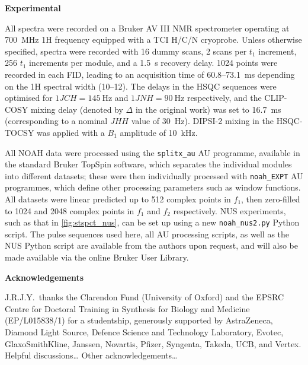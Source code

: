 \documentclass[11pt]{article}
\newcommand*{\proton}{1H}
\newcommand*{\onejch}{1JCH}
\newcommand*{\onejnh}{1JNH}
\newcommand*{\jhh}{JHH}
\begin{document}
\begin{refsection}
\textbf{\Large Experimental}

All spectra were recorded on a Bruker AV III NMR spectrometer operating at \SI{700}{\MHz} \proton{} frequency equipped with a TCI H/C/N cryoprobe.
Unless otherwise specified, spectra were recorded with 16 dummy scans, 2 scans per $t_1$ increment, 256 $t_1$ increments per module, and a \SI{1.5}{\s} recovery delay.
1024 points were recorded in each FID, leading to an acquisition time of 60.8--\SI{73.1}{\ms} depending on the \proton{} spectral width (10--\SI{12}{\ppm}).
The delays in the HSQC sequences were optimised for $\onejch = \SI{145}{\Hz}$ and $\onejnh = \SI{90}{\Hz}$ respectively, and the CLIP-COSY mixing delay (denoted by $\Delta$ in the original work\autocite{Koos2016ACIE}) was set to \SI{16.7}{\ms} (corresponding to a nominal $\jhh$ value of \SI{30}{Hz}).
DIPSI-2 mixing in the HSQC-TOCSY was applied with a $B_1$ amplitude of \SI{10}{\kHz}.


All NOAH data were processed using the \texttt{splitx\_au} AU programme, available in the standard Bruker TopSpin software, which separates the individual modules into different datasets; these were then individually processed with \texttt{noah\_EXPT} AU programmes, which define other processing parameters such as window functions.
All datasets were linear predicted up to 512 complex points in $f_1$, then zero-filled to 1024 and 2048 complex points in $f_1$ and $f_2$ respectively.
NUS experiments, such as that in \cref{fig:stspct_nus}, can be set up using a new \texttt{noah\_nus2.py} Python script.
The pulse sequences used here, all AU processing scripts, as well as the NUS Python script are available from the authors upon request, and will also be made available via the online Bruker User Library.


\textbf{\Large Acknowledgements}

J.R.J.Y.\ thanks the Clarendon Fund (University of Oxford) and the EPSRC Centre for Doctoral Training in Synthesis for Biology and Medicine (EP/L015838/1) for a studentship, generously supported by AstraZeneca, Diamond Light Source, Defence Science and Technology Laboratory, Evotec, GlaxoSmithKline, Janssen, Novartis, Pfizer, Syngenta, Takeda, UCB, and Vertex.
Helpful discussions\ldots
Other acknowledgements\ldots

\printbibliography
\end{refsection}
\begin{refsection}

\end{refsection}
\end{document}
